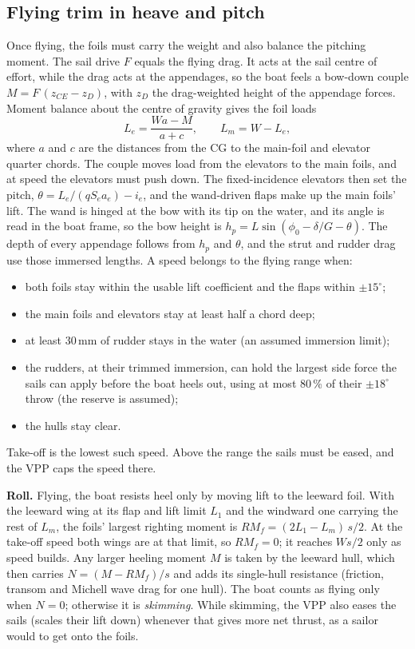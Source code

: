 \documentclass[10pt,twocolumn]{article}
\begin{document}
\subsection{Flying trim in heave and pitch}\label{sec:trim}
Once flying, the foils must carry the weight and also balance the pitching moment. The sail drive $F$ equals the flying drag. It acts at the sail centre of effort, while the drag acts at the appendages, so the boat feels a bow-down couple $M=F\,(z_{CE}-z_D)$, with $z_D$ the drag-weighted height of the appendage forces. Moment balance about the centre of gravity gives the foil loads
\begin{equation}
L_e=\frac{W a-M}{a+c},\qquad L_m=W-L_e,
\end{equation}
where $a$ and $c$ are the distances from the CG to the main-foil and elevator quarter chords. The couple moves load from the elevators to the main foils, and at speed the elevators must push down. The fixed-incidence elevators then set the pitch, $\theta=L_e/(qS_ea_e)-i_e$, and the wand-driven flaps make up the main foils' lift. The wand is hinged at the bow with its tip on the water, and its angle is read in the boat frame, so the bow height is $h_p=L\sin(\phi_0-\delta/G-\theta)$. The depth of every appendage follows from $h_p$ and $\theta$, and the strut and rudder drag use those immersed lengths. A speed belongs to the flying range when:
\begin{itemize}\itemsep1pt
\item both foils stay within the usable lift coefficient and the flaps within $\pm15^\circ$;
\item the main foils and elevators stay at least half a chord deep;
\item at least 30\,mm of rudder stays in the water (an assumed immersion limit);
\item the rudders, at their trimmed immersion, can hold the largest side force the sails can apply before the boat heels out, using at most 80\,\% of their $\pm18^\circ$ throw (the reserve is assumed);
\item the hulls stay clear.
\end{itemize}
Take-off is the lowest such speed. Above the range the sails must be eased, and the VPP caps the speed there.

\noindent\textbf{Roll.} Flying, the boat resists heel only by moving lift to the leeward foil. With the leeward wing at its flap and lift limit $L_1$ and the windward one carrying the rest of $L_m$, the foils' largest righting moment is $RM_f=(2L_1-L_m)\,s/2$. At the take-off speed both wings are at that limit, so $RM_f=0$; it reaches $Ws/2$ only as speed builds. Any larger heeling moment $M$ is taken by the leeward hull, which then carries $N=(M-RM_f)/s$ and adds its single-hull resistance (friction, transom and Michell wave drag for one hull). The boat counts as flying only when $N=0$; otherwise it is \emph{skimming}. While skimming, the VPP also eases the sails (scales their lift down) whenever that gives more net thrust, as a sailor would to get onto the foils.
\end{document}
